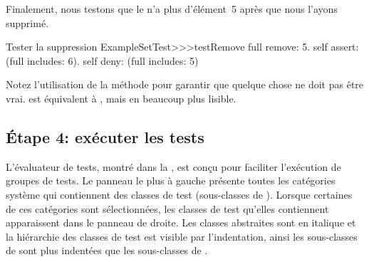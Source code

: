 \documentclass[a4paper,10pt,twoside]{book}
\begin{document}
Finalement, nous testons que le  n'a plus d'élément~5 après que nous l'ayons supprimé.

\begin{method}[testRemove]{Tester la suppression}
ExampleSetTest>>>testRemove
	full remove: 5.
	self assert: (full includes: 6).
	self deny: (full includes: 5)
\end{method}

\noindent
Notez l'utilisation de la méthode  pour garantir que quelque chose ne doit pas être vrai.
 est équivalent à , mais en beaucoup plus lisible.
\subsection{\'Etape 4: exécuter les tests}
L'évaluateur de tests, montré dans la , est conçu pour faciliter l'exécution de groupes de tests.
Le panneau le plus à gauche présente toutes les catégories système qui contiennent des classes de test (\ie  sous-classes de ). Lorsque certaines de ces catégories sont sélectionnées, les classes de test qu'elles contiennent apparaissent dans le panneau de droite. Les classes abstraites sont en italique et la hiérarchie des classes de test est visible par l'indentation, ainsi les sous-classes de   sont plus indentées que les sous-classes de .
\end{document}
